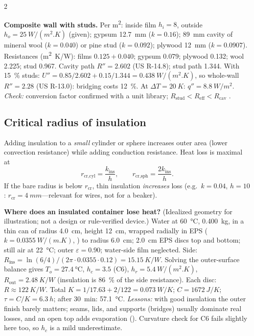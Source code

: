 \begin{multicols}{2}
\begin{demobox}\textbf{Composite wall with studs.} Per \si{m^2}: inside film $h_i=8$, outside $h_o=\SI{25}{W/(m^2.K)}$ (given); gypsum \SI{12.7}{mm} ($k=0.16$); \SI{89}{mm} cavity of mineral wool ($k=0.040$) or pine stud ($k=0.092$); plywood \SI{12}{mm} ($k=0.0907$).
Resistances (\si{m^2.K/W}): films $0.125+0.040$; gypsum 0.079; plywood 0.132; wool 2.225; stud 0.967.
Cavity path $R''=2.602$ (US R-14.8); stud path 1.344. With \SI{15}{\percent} studs: $U''=0.85/2.602+0.15/1.344=\SI{0.438}{W/(m^2.K)}$, so whole-wall $R''=2.28$ (US R-13.0): bridging costs \SI{12}{\percent}. At $\Delta T=\SI{20}{K}$: $q''=\SI{8.8}{W/m^2}$.
\emph{Check:} conversion factor confirmed with a unit library; $R_{\text{stud}}<R_{\text{eff}}<R_{\text{cav}}$ \checkmark.\end{demobox}

\subsection{Critical radius of insulation}\label{sec:critradius}
Adding insulation to a \emph{small} cylinder or sphere increases outer area (lower convection resistance) while adding conduction resistance. Heat loss is maximal at
\begin{equation}
r_{\text{cr,cyl}}=\frac{k_{\text{ins}}}{h},\qquad r_{\text{cr,sph}}=\frac{2k_{\text{ins}}}{h}. \label{F:transfer:rcrit}
\end{equation}
If the bare radius is below $r_{\text{cr}}$, thin insulation \emph{increases} loss (e.g.\ $k=0.04$, $h=10$: $r_{\text{cr}}=\SI{4}{mm}$---relevant for wires, not for a beaker).

\begin{demobox}\textbf{Where does an insulated container lose heat?} (Idealized geometry for illustration; not a design or rule-verified device.) Water at \SI{60}{\celsius}, \SI{0.400}{kg}, in a thin can of radius \SI{4.0}{cm}, height \SI{12}{cm}, wrapped radially in EPS ($k=\SI{0.0355}{W/(m.K)}$, ) to radius \SI{6.0}{cm}; \SI{2.0}{cm} EPS discs top and bottom; still air at \SI{22}{\celsius}; outer $\varepsilon=0.90$; water-side film neglected.
Side: $R_{\text{ins}}=\ln(6/4)/(2\pi\cdot0.0355\cdot0.12)=\SI{15.15}{K/W}$. Solving the outer-surface balance gives $T_o=\SI{27.4}{\celsius}$, $h_c=3.5$ (C6), $h_r=\SI{5.4}{W/(m^2.K)}$, $R_{\text{out}}=\SI{2.48}{K/W}$ (insulation is \SI{86}{\percent} of the side resistance). Each disc: $R\approx\SI{122}{K/W}$.
Total $K=1/17.63+2/122=\SI{0.073}{W/K}$; $C=\SI{1672}{J/K}$; $\tau=C/K=\SI{6.3}{h}$; after \SI{30}{min}: \SI{57.1}{\celsius}.
\emph{Lessons:} with good insulation the outer finish barely matters; seams, lids, and supports (bridges) usually dominate real losses, and an open top adds evaporation (). Curvature check for C6 fails slightly here too, so $h_c$ is a mild underestimate.\end{demobox}


\end{multicols}
